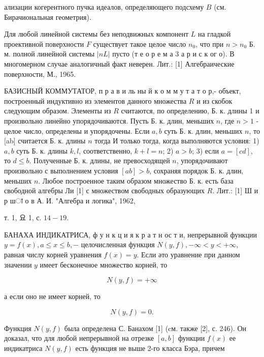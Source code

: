 \documentclass[10pt]{article}
\begin{document}
ализации когерентного пучка идеалов, определяющего подсхему $B$ (см. Бирачиональная геометрия).



Для любой линейной системы без неподвижных компонент $L$ на гладкой проективной поверхности $F$ существует такое целое число $n_{0}$, что при $n>n_{0}$ Б. м. полной линейной системы $|n L|$ пусто (т е о р е м а 3 а р и с к ог о). В многомерном случае аналогичный факт неверен. Лит.: [1] Алгебраические поверхности, М., 1965.



БАЗИСНЫЙ КОММУТАТОР, п р а в и ль ны й к о м м у т а т о р,- объект, построенный индуктивно из элементов данного множества $R$ и из скобок следующим образом. Элементы из $R$ считаются, по определению, Б. к. длины 1 и произвольно линейно упорядочиваются. Пусть Б. к. длин, меньших $n$, где $n>1$ - целое число, определены и упорядочены. Если $a, b$ суть Б. к. длин, меньших $n$, то [ab] считается Б. к. длины $n$ тогда И только тогда, когда выполняются условия: 1) $a, b$ суть Б. к. длины $k, l$, соответственно, $k+l=n$; 2) $a>b$; 3) если $a=[c d]$, то $d \leqslant b$. Полученные Б. к. длины, не превосходящей $n$, упорядочивают произвольно с выполнением условия $[a b]>b$, сохраняя порядок Б. к. длин, меньших $n$. Любое построенное таким образом множество Б. к. есть база свободной алгебры Ли [1] с множеством свободных образующих $R$. Лит.: [1] Ш и р шा о в А. И. "Алгебра и логика", 1962,

т. 1, 요 1, с. $14-19$.



БАНАХА ИНДИКАТРИСА, ф у н к ц и я к р а т н ос т и, непрерывной функции $y=f(x), a \leqslant x \leqslant b,-$ целочисленная функция $N(y, f),-\infty<y<+\infty$, равная числу корней уравнения $f(x)=y$. Если әто уравнение при данном значении $y$ имеет бесконечное множество корней, то



\[

N(y, f)=+\infty

\]



а если оно не имеет корней, то



\[

N(y, f)=0 .

\]



Функция $N(y, f)$ была определена С. Банахом [1] (cм. также [2], с. 246). Он доказал, что для любой непрерывной на отрезке $[a, b]$ функции $f(x)$ ее индикатриса $N(y, f)$ есть функция не выше 2-го класса Бэра, причем
\end{document}
